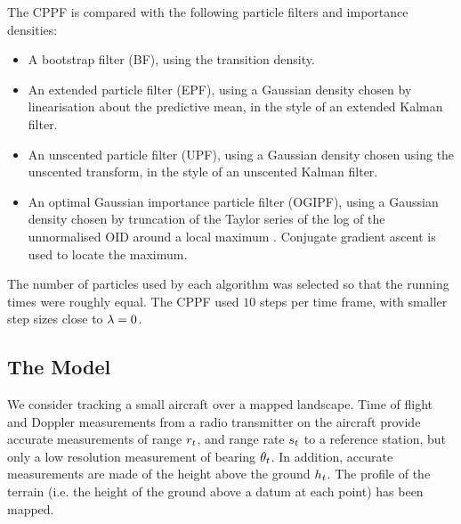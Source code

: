 \documentclass[conference]{IEEEtran}
\begin{document}
The CPPF is compared with the following particle filters and importance densities:
\begin{itemize}
	\item A bootstrap filter (BF), using the transition density.
	\item An extended particle filter (EPF), using a Gaussian density chosen by linearisation about the predictive mean, in the style of an extended Kalman filter.
	\item An unscented particle filter (UPF), using a Gaussian density chosen using the unscented transform, in the style of an unscented Kalman filter.
	\item An optimal Gaussian importance particle filter (OGIPF), using a Gaussian density chosen by truncation of the Taylor series of the log of the unnormalised OID around a local maximum \cite{Doucet2000a}. Conjugate gradient ascent is used to locate the maximum.
\end{itemize}

The number of particles used by each algorithm was selected so that the running times were roughly equal. The CPPF used $10$ steps per time frame, with smaller step sizes close to $\lambda=0$.

\subsection{The Model}

We consider tracking a small aircraft over a mapped landscape. Time of flight and Doppler measurements from a radio transmitter on the aircraft provide accurate measurements of range $r_{t}$, and range rate $s_{t}$ to a reference station, but only a low resolution measurement of bearing $\theta_{t}$. In addition, accurate measurements are made of the height above the ground $h_{t}$. The profile of the terrain (i.e. the height of the ground above a datum at each point) has been mapped.
\end{document}
